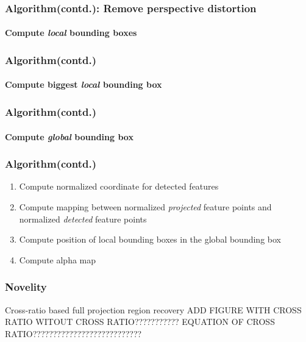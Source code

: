 \documentclass{beamer}
\begin{document}

\begin{frame}
\frametitle{Algorithm(contd.): Remove perspective distortion}
\framesubtitle{Compute \textit{local} bounding boxes}


\end{frame}


\begin{frame}
\frametitle{Algorithm(contd.)}
\framesubtitle{Compute biggest \textit{local} bounding box}
\end{frame}


\begin{frame}
\frametitle{Algorithm(contd.)}
\framesubtitle{Compute \textit{global} bounding box}
\end{frame}

\begin{frame}
\frametitle{Algorithm(contd.)}
\begin{enumerate}
\item Compute normalized coordinate for detected features
\item Compute mapping between normalized \textit{projected} feature points and normalized \textit{detected} feature points
\item Compute position of local bounding boxes in the global bounding box
\item Compute alpha map
\end{enumerate}
\end{frame}

\begin{frame}
\frametitle{Novelity}
Cross-ratio based full projection region recovery
ADD FIGURE WITH CROSS RATIO WITOUT CROSS RATIO???????????
EQUATION OF CROSS RATIO???????????????????????????
\end{frame}
\end{document}
